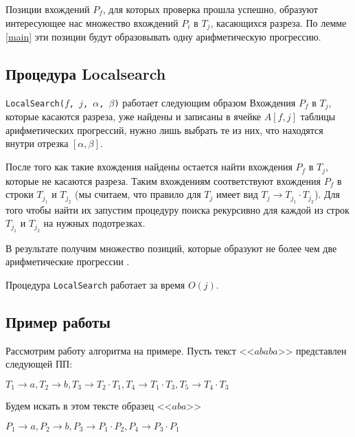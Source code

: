 \documentclass[14pt]{article}
\begin{document}
 
Позиции вхождений $P_f$, для которых проверка прошла успешно, образуют интересующее нас множество 
вхождений $P_i$ в $T_j$, касающихся разреза. 
По лемме \ref{main} эти позиции будут образовывать одну арифметическую прогрессию.


\subsection{Процедура Localsearch}

\texttt{LocalSearch($f$, $j$, $\alpha$, $\beta$)} работает следующим образом
Вхождения $P_f$ в $T_j$, которые касаются разреза, уже найдены и записаны в ячейке $A[f, j]$ таблицы арифметических прогрессий, нужно лишь выбрать те из них,
что находятся внутри отрезка $[\alpha, \beta]$.

После того как такие вхождения найдены остается найти вхождения $P_f$ в $T_j$, которые не касаются разреза. Таким вхождениям соответствуют вхождения $P_f$ в строки $T_{j_1}$ и $T_{j_2}$ (мы считаем, что правило для $T_j$ имеет вид $T_j \to T_{j_1}\cdot T_{j_2}$).
Для того чтобы найти их запустим процедуру поиска рекурсивно для каждой из строк $T_{j_1}$ и $T_{j_2}$ на нужных подотрезках.

В результате получим множество позиций, которые образуют не более чем две арифметические прогрессии \cite{Lifshits}.

Процедура \texttt{LocalSearch} работает за время $O(j)$.

\subsection{Пример работы}

Рассмотрим работу алгоритма на примере. Пусть текст <<$ababa$>> представлен следующей ПП:

\begin{center}
$T_1 \to a, T_2 \to b, T_3 \to T_2\cdot T_1, T_4 \to T_1\cdot T_3, T_5 \to T_4\cdot T_3$
\end{center}

Будем искать в этом тексте образец <<$aba$>>

\begin{center}
$P_1 \to a, P_2 \to b, P_3 \to P_1\cdot P_2, P_4 \to P_3\cdot P_1$
\end{center}
\end{document}
